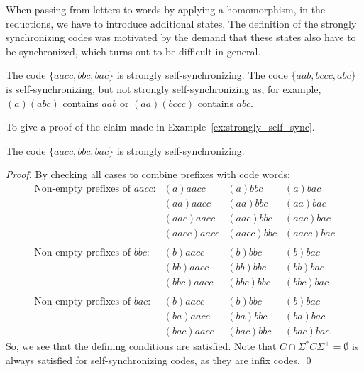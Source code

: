  When passing from letters to words by applying a homomorphism, in the reductions,
 we have to introduce additional states. The definition of the strongly synchronizing
 codes was motivated by the demand that these states also have to be synchronized, which turns out to be difficult in general.

\begin{example}\label{ex:strongly_self_sync}
 The code $\{aacc,bbc,bac\}$
 is strongly self-synchronizing.
 The code $\{ aab, bccc, abc \}$ is self-synchronizing, but
 not strongly self-synchronizing as, for example, $(a)(abc)$ 
 contains $aab$ or $(aa)(bccc)$ contains $abc$. 
\end{example}

\begin{toappendix}
 To give a proof of the claim made in Example~\ref{ex:strongly_self_sync}.
\begin{proposition}
 The code $\{aacc,bbc,bac\}$ is strongly self-synchronizing.
\end{proposition}
\begin{proof}
 By checking all cases to combine prefixes with code words:
 \[ 
 \begin{array}{llll}
     \mbox{Non-empty prefixes of $aacc$:} & (a)aacc & (a)bbc & (a)bac \\ 
      & (aa)aacc  & (aa)bbc  & (aa)bac \\ 
      & (aac)aacc & (aac)bbc & (aac)bac \\ 
      & (aacc)aacc & (aacc)bbc & (aacc)bac \\ 
      \\
     \mbox{Non-empty prefixes of $bbc$:} & (b)aacc   & (b)bbc   & (b)bac \\    
     & (bb)aacc  & (bb)bbc  & (bb)bac \\ 
     & (bbc)aacc & (bbc)bbc & (bbc)bac \\ 
     \\
     \mbox{Non-empty prefixes of $bac$:} & (b)aacc   & (b)bbc   & (b)bac \\    
     & (ba)aacc  & (ba)bbc  & (ba)bac \\ 
     & (bac)aacc & (bac)bbc & (bac)bac. 
 \end{array}
 \]
 So, we see that the defining conditions are satisfied. Note that $C \cap \Sigma^*C\Sigma^+ = \emptyset$
 is always satisfied for self-synchronizing codes, as they are infix codes. \qed
\end{proof}
\end{toappendix}



